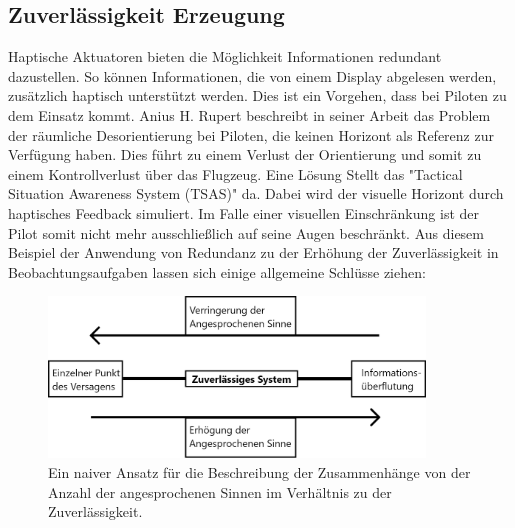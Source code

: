 \documentclass{llncs}					%
\begin{document}
\subsection{Zuverlässigkeit Erzeugung}
Haptische Aktuatoren bieten die Möglichkeit Informationen redundant dazustellen. So können Informationen, die von einem Display abgelesen werden, zusätzlich haptisch unterstützt werden. Dies ist ein Vorgehen, dass bei Piloten zu dem Einsatz kommt.
Anius H. Rupert\cite{rupert2000instrumentation} beschreibt in seiner Arbeit das Problem der räumliche Desorientierung bei Piloten, die keinen Horizont als Referenz zur Verfügung haben. Dies führt zu einem Verlust der Orientierung und somit zu einem Kontrollverlust über das Flugzeug. Eine Lösung Stellt das "Tactical Situation Awareness System (TSAS)"\cite{rupert2000instrumentation} da. Dabei wird der visuelle Horizont durch haptisches Feedback simuliert\cite{rupert2000instrumentation}. Im Falle einer visuellen Einschränkung ist der Pilot somit nicht mehr ausschließlich auf seine Augen beschränkt.
Aus diesem Beispiel der Anwendung von Redundanz zu der Erhöhung der Zuverlässigkeit in Beobachtungsaufgaben lassen sich einige allgemeine Schlüsse ziehen:

\begin{figure}[htbp]
	\begin{center}
		\includegraphics[width = 10cm]{Grafiken/Sinne-Redundanz-Verhaeltnis.png}
		\caption{Ein naiver Ansatz für die Beschreibung der Zusammenhänge von der Anzahl der angesprochenen Sinnen im Verhältnis zu der Zuverlässigkeit.}
		\label{Sinne_Redundanz_Verhaeltnis}
	\end{center}
\end{figure}
\end{document}
